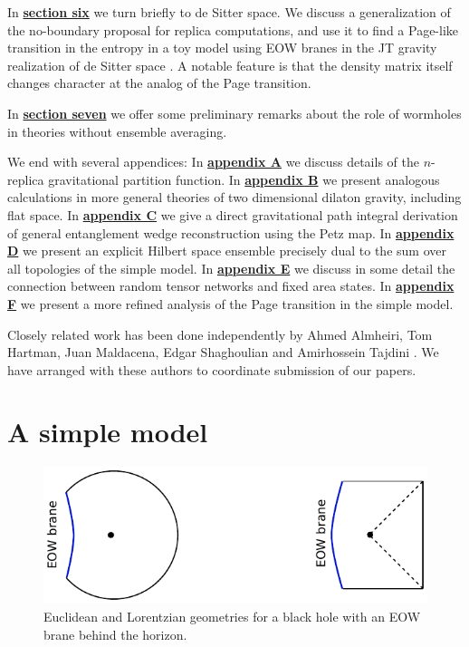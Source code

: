 \documentclass[12pt]{article}
\numberwithin{equation}{section}
\begin{document}

In \hyperref[sec:desitter]{{\bf section six}} we turn briefly to de Sitter space. We discuss a generalization of the no-boundary proposal for replica computations, and use it to find a Page-like transition in the entropy in a toy model using EOW branes in the JT gravity realization of de Sitter space \cite{Maldacena:2019cbz}.  A notable feature is that the density matrix itself changes character at the analog of the Page transition.

In \hyperref[sec:discussion]{{\bf section seven}} we offer some preliminary remarks about the role of wormholes in theories without ensemble averaging.  


We end with  several appendices: In \hyperref[app:zn]{\bf appendix A} we discuss details of the $n$-replica gravitational partition function. In \hyperref[app:dilatongravity]{\bf appendix B} we present analogous calculations in more general theories of two dimensional dilaton gravity, including flat space. In \hyperref[app:ew]{\bf appendix C} we give a direct gravitational path integral derivation of general entanglement wedge reconstruction using the Petz map. In \hyperref[app:ensemble]{\bf appendix D} we present an explicit Hilbert space ensemble precisely dual to the sum over all topologies of the simple model. In \hyperref[app:pagephases]{\bf appendix E} we discuss in some detail the connection between random tensor networks and fixed area states. In \hyperref[app:pagephases]{\bf appendix F} we present a more refined analysis  of the Page transition in the simple model.

\vspace{1em}
Closely related work has been done independently by Ahmed Almheiri, Tom Hartman, Juan Maldacena, Edgar Shaghoulian and Amirhossein Tajdini \cite{Almheiri:2019qdq}.  We have arranged with these authors to coordinate submission of our papers.

\newpage


\section{A simple model}\label{sec:asimplemodel}
\begin{figure}[t]
\begin{center}
\includegraphics[scale = .95]{images/1.pdf}
\caption{{\small Euclidean and Lorentzian geometries for a black hole with an EOW brane behind the horizon.}}\label{fig1}
\end{center}
\end{figure}
\end{document}
